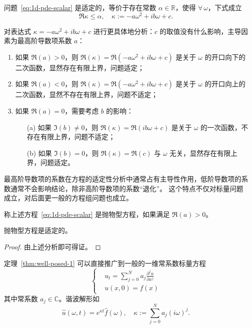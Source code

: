 \begin{theorem}\label{thm:well-posed-1}
    问题~\eqref{eq:1d-pde-scalar} 是适定的，等价于存在常数 $\alpha \in \mathbb{R}$，使得 $\forall\,\omega $，下式成立
    \[
        \Re \kappa \le \alpha,  \quad  \kappa := -a \omega ^2 + i b \omega  + c.
    \]
\end{theorem}

对表达式 $\kappa = -a \omega ^2 + i b \omega  + c$ 进行更具体地分析：$c$ 的取值没有什么影响，主导因素为最高阶导数项系数 $a$：

\begin{enumerate}
    \item 如果 $\Re(a) > 0$，则 $\Re(\kappa) = \Re(-a \omega ^2 + i b \omega  + c)$ 是关于 $\omega $ 的开口向下的二次函数，显然存在有限上界，问题适定；
    \item 如果 $\Re(a) < 0$，则 $\Re(\kappa) = \Re(-a \omega ^2 + i b \omega  + c)$ 是关于 $\omega $ 的开口向上的二次函数，显然不存在有限上界，问题不适定；
    \item 如果 $\Re(a) = 0$，需要考虑 $b$ 的影响：
          \begin{itemize}
              \item[(a)] 如果 $\Im(b) \neq 0$，则 $\Re(\kappa) = \Re(i b \omega  + c)$ 是关于 $\omega $ 的一次函数，不存在有限上界，问题不适定；
              \item[(b)] 如果 $\Im(b) = 0$，则 $\Re(\kappa) = \Re(c)$ 与 $\omega $ 无关，显然存在有限上界，问题适定。
          \end{itemize}
\end{enumerate}

\begin{remark}
    最高阶导数项的系数在方程的适定性分析中通常占有主导性作用，低阶导数项的系数通常不会影响结论，除非高阶导数项的系数“退化”。
    这个特点不仅对标量问题成立，对后面更一般的方程组问题也成立。
\end{remark}

\begin{definition}
    称上述方程~\eqref{eq:1d-pde-scalar} 是抛物型方程，如果满足 $\Re(a) > 0$。
\end{definition}

\begin{theorem}
    抛物型方程是适定的。
\end{theorem}

\begin{proof}
    由上述分析即可得证。
\end{proof}

定理~\ref{thm:well-posed-1} 可以直接推广到一般的一维常系数标量方程
\begin{equation}
    \left\{
    \begin{aligned}
         & u_t = \sum_{j=0}^N a_j \frac{\partial^j u}{\partial x^j} \\
         & u(x,0) = f(x)
    \end{aligned}
    \right.
    \label{eq:1d-pde-scalar-general}
\end{equation}
其中常系数 $a_j \in \mathbb{C}$。谐波解形如
\[
    \hat{u}(\omega,t) = e^{\kappa t} \hat{f}(\omega), \quad  \kappa := \sum_{j=0}^N a_j (i \omega)^j.
\]

